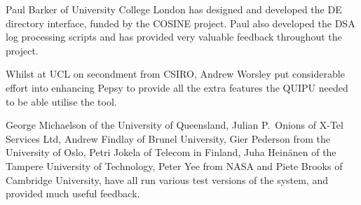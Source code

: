 Paul Barker of
University College London has designed and developed the DE directory
interface, funded by the COSINE project.
Paul also developed the DSA log processing scripts and has provided 
very valuable feedback throughout the project.

Whilst at UCL on secondment from CSIRO, 
Andrew Worsley put considerable effort into 
enhancing Pepsy to provide all the extra features the QUIPU needed to be able
utilise the tool.

George Michaelson of the University of Queensland,
Julian P.~Onions of X-Tel Services Ltd,
Andrew Findlay of Brunel University,
Gier Pederson from the University of Oslo,
Petri Jokela of Telecom in Finland,
Juha Hein\"{a}nen of the Tampere University of Technology,
Peter Yee from NASA and
Piete Brooks of Cambridge University,
have all run various test
versions of the system, and provided much useful feedback.


